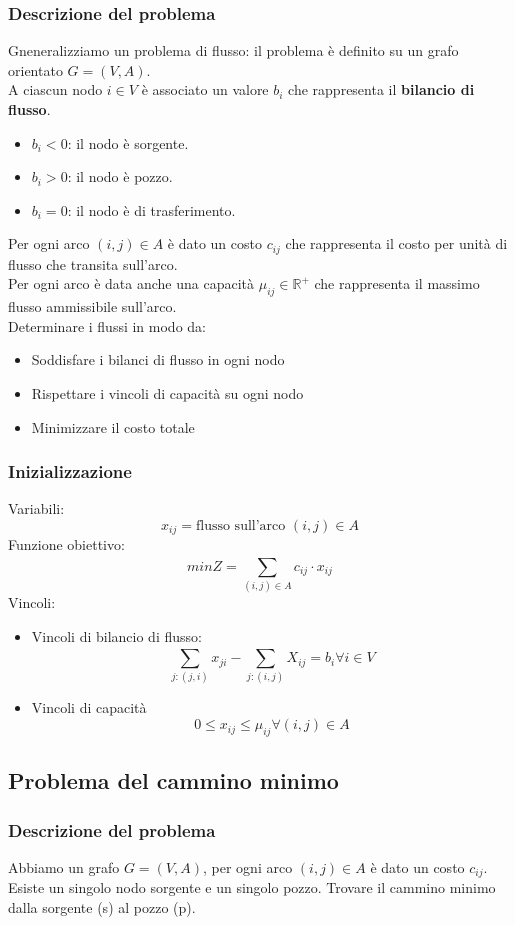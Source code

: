 \documentclass[12pt,a4paper]{article}
\begin{document}
\subsubsection{Descrizione del problema}
Gneneralizziamo un problema di flusso: il problema è definito su un grafo orientato $G = (V,A)$.\\
A ciascun nodo $i \in V$ è associato un valore $b_i$ che rappresenta il \textbf{bilancio di flusso}.
\begin{itemize}
    \item $b_i < 0$: il nodo è sorgente.
    \item $b_i > 0$: il nodo è pozzo.
    \item $b_i = 0$: il nodo è di trasferimento.
\end{itemize}
Per ogni arco $(i,j) \in A$ è dato un costo $c_{ij}$ che rappresenta il costo per unità di flusso che transita sull'arco.\\
Per ogni arco è data anche una capacità $\mu_{ij} \in \mathbb{R}^+$ che rappresenta il massimo flusso ammissibile sull'arco.\\
Determinare i flussi in modo da:
\begin{itemize}
    \item Soddisfare i bilanci di flusso in ogni nodo
    \item Rispettare i vincoli di capacità su ogni nodo
    \item Minimizzare il costo totale
\end{itemize}
\subsubsection{Inizializzazione}
Variabili:
\[
x_{ij} = \text{flusso sull'arco } (i,j) \in A
\]
Funzione obiettivo:
\[
minZ = \sum_{(i,j)\in A}^{} c_{ij} \cdot x_{ij}
\]
Vincoli:
\begin{itemize}
    \item Vincoli di bilancio di flusso:
    \[
    \sum_{j:(j,i)}^{} x_{ji} - \sum_{j:(i,j)}^{} X_{ij} = b_{i} \forall i \in V
    \]
    \item Vincoli di capacità
    \[
    0 \leq x_{ij} \leq \mu_{ij} \forall (i,j) \in A
    \]
\end{itemize}
\subsection{Problema del cammino minimo}
\subsubsection{Descrizione del problema}
Abbiamo un grafo $G = (V,A)$, per ogni arco $(i,j) \in A$ è dato un costo $c_{ij}$.\\
Esiste un singolo nodo sorgente e un singolo pozzo. Trovare il cammino minimo dalla sorgente (s) al pozzo (p).
\end{document}
